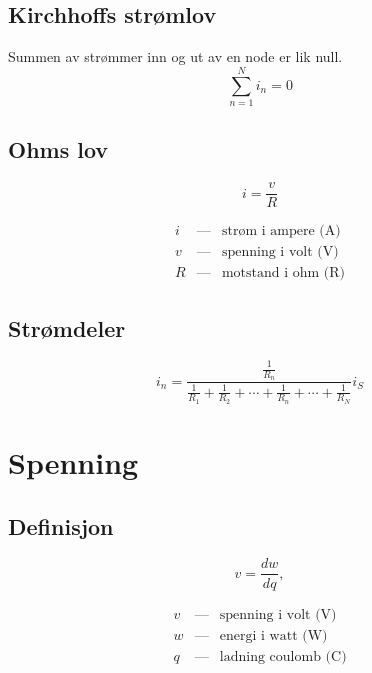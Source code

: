 \documentclass[norsk, a4paper, 12pt, twoside, titlepage]{article}
\begin{document}
\subsection{Kirchhoffs strømlov}
Summen av strømmer inn og ut av en node er lik null.
\begin{equation}
\sum_{n=1}^{N}i_{n} = 0
\end{equation}

\subsection{Ohms lov}
\begin{equation}
i = \frac{v}{R}
\end{equation}

\begin{eqnarray*}
i & \mbox{---} & \mbox{strøm i ampere (A)} \\
v & \mbox{---} & \mbox{spenning i volt (V)} \\
R & \mbox{---} & \mbox{motstand i ohm (R)}
\end{eqnarray*}

\subsection{Strømdeler}
\begin{equation}
i_{n} = \frac{\frac{1}{R_{n}}}{\frac{1}{R_{1}} + \frac{1}{R_{2}} + \cdots + \frac{1}{R_{n}} + \cdots + \frac{1}{R_{N}}} i_{S}
\end{equation}


\newpage
\section{Spenning}
\subsection{Definisjon}
\begin{equation}
v = \frac{dw}{dq},
\end{equation}

\begin{eqnarray*}
v & \mbox{---} & \mbox{spenning i volt (V)} \\
w & \mbox{---} & \mbox{energi i watt (W)} \\
q & \mbox{---} & \mbox{ladning coulomb (C)}
\end{eqnarray*}
\end{document}
